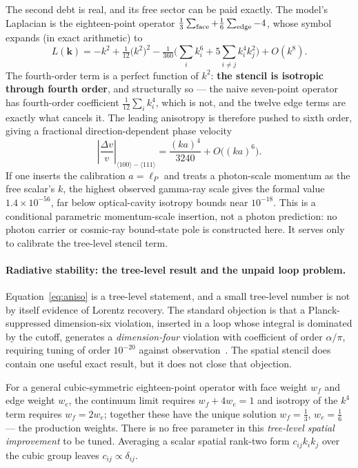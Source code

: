 \documentclass[11pt,a4paper]{article}
\theoremstyle{definition}
\theoremstyle{plain}
\theoremstyle{remark}
\begin{document}
The second debt is real, and its free sector can be paid exactly. The
model's Laplacian is the eighteen-point operator
$\tfrac13\sum_{\rm face} + \tfrac16\sum_{\rm edge} - 4$, whose symbol
expands (in exact arithmetic) to
\begin{equation}
L(\mathbf{k}) = -k^2 + \tfrac1{12}\big(k^2\big)^2
- \tfrac1{360}\Big(\textstyle\sum_i k_i^6
+ 5\sum_{i\neq j}k_i^4k_j^2\Big) + O(k^8).
\label{eq:symbol}
\end{equation}
The fourth-order term is a perfect function of $k^2$: \textbf{the stencil
is isotropic through fourth order}, and structurally so --- the naive
seven-point operator has fourth-order coefficient
$\tfrac1{12}\sum_i k_i^4$, which is not, and the twelve edge terms are
exactly what cancels it. The leading anisotropy is therefore pushed to
sixth order, giving a fractional direction-dependent phase velocity
\begin{equation}
\left|\frac{\Delta v}{v}\right|_{\langle100\rangle-\langle111\rangle}
= \frac{(ka)^4}{3240} + O\big((ka)^6\big).
\label{eq:aniso}
\end{equation}
If one inserts the calibration $a=\ell_P$ and treats a photon-scale
momentum as the free scalar's $k$, the highest observed gamma-ray scale
gives the formal value $1.4\times10^{-56}$, far below optical-cavity
isotropy bounds near $10^{-18}$.  This is a conditional parametric
momentum-scale insertion, not a photon prediction: no photon carrier or
cosmic-ray bound-state pole is constructed here.  It serves only to
calibrate the tree-level stencil term.

\paragraph{Radiative stability: the tree-level result and the unpaid loop problem.}
\label{sec:radiative}

Equation~\eqref{eq:aniso} is a tree-level statement, and a small
tree-level number is not by itself evidence of Lorentz recovery. The
standard objection is that a Planck-suppressed dimension-six violation,
inserted in a loop whose integral is dominated by the cutoff, generates a
\emph{dimension-four} violation with coefficient of order $\alpha/\pi$,
requiring tuning of order $10^{-20}$ against observation~\cite{collins}.
The spatial stencil does contain one useful exact result, but it does not
close that objection.

For a general cubic-symmetric
eighteen-point operator with face weight $w_f$ and edge weight $w_e$, the
continuum limit requires $w_f + 4w_e = 1$ and isotropy of the $k^4$ term
requires $w_f = 2w_e$; together these have the unique solution
$w_f = \tfrac13$, $w_e = \tfrac16$ --- the production weights. There is
no free parameter in this \emph{tree-level spatial improvement} to be
tuned. Averaging a scalar spatial rank-two form $c_{ij}k_ik_j$ over the
cubic group leaves $c_{ij}\propto\delta_{ij}$.
\end{document}
